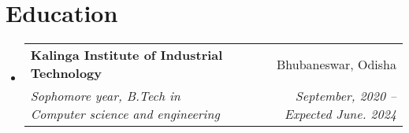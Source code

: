 \documentclass[letterpaper,11pt]{article}
\makeatletter
\newcommand{\resumeSubheading}[4]{
  \vspace{-2pt}\item
    \begin{tabular*}{0.97\textwidth}[t]{l@{\extracolsep{\fill}}r}
      \textbf{#1} & #2 \\
      \textit{\small#3} & \textit{\small #4} \\
    \end{tabular*}\vspace{-7pt}
}
\newcommand{\resumeSubHeadingListStart}{\begin{itemize}[leftmargin=0.15in, label={}]}
\newcommand{\resumeSubHeadingListEnd}{\end{itemize}}
\makeatother
\begin{document}
\section{Education}
  \resumeSubHeadingListStart
    \resumeSubheading
      {Kalinga Institute of Industrial Technology}{Bhubaneswar, Odisha}
      {Sophomore year, B.Tech in Computer science and engineering}{September, 2020 -- Expected June. 2024}
  \resumeSubHeadingListEnd
\end{document}
